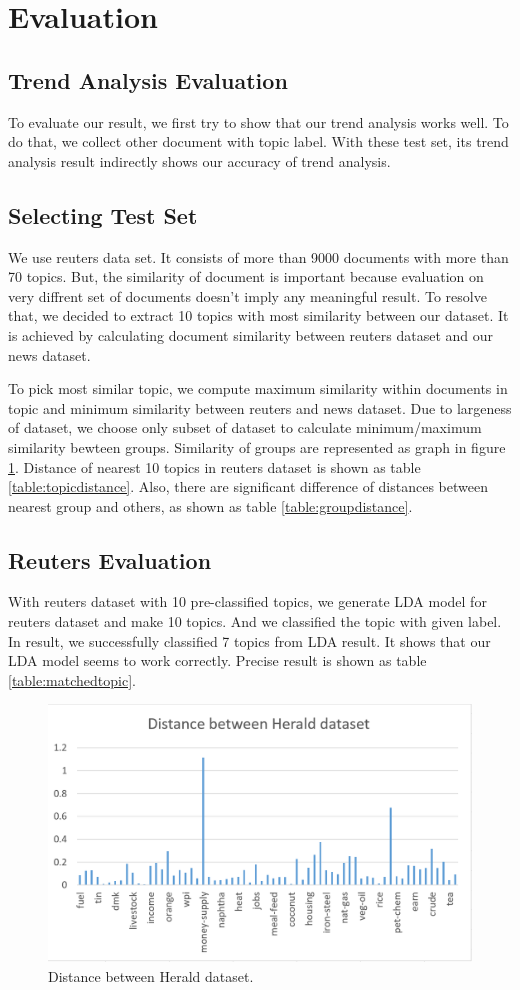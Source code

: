 \section{Evaluation}

\subsection{Trend Analysis Evaluation}
To evaluate our result, we first try to show that our trend analysis
works well. To do that, we collect other document with topic label.
With these test set, its trend analysis result indirectly shows our
accuracy of trend analysis.
\subsection{Selecting Test Set}
We use reuters data set. It consists of more than 9000 documents
with more than 70 topics. But, the similarity of document is important
because evaluation on very diffrent set of documents doesn't imply
any meaningful result. To resolve that, we decided to extract 10 topics
with most similarity between our dataset. It is achieved by calculating
document similarity between reuters dataset and our news dataset.

To pick most similar topic, we compute maximum similarity within documents
in topic and minimum similarity between reuters and news dataset. Due to
largeness of dataset, we choose only subset of dataset to calculate
minimum/maximum similarity bewteen groups. Similarity of groups are
represented as graph in figure \ref{fig:distance}. Distance of nearest
10 topics in reuters dataset is shown as table \ref{table:topicdistance}.
Also, there are significant difference of distances between nearest group and
others, as shown as table \ref{table:groupdistance}.

\subsection{Reuters Evaluation}
With reuters dataset with 10 pre-classified topics, we generate LDA
model for reuters dataset and make 10 topics. And we classified the topic
with given label. In result, we successfully classified 7 topics from
LDA result. It shows that our LDA model seems to work correctly. Precise
result is shown as table \ref{table:matchedtopic}.

\begin{figure}[!htbp]
  \centering
  \includegraphics[width=0.8\linewidth]{Distance1}
  \caption{Distance between Herald dataset.}
  \label{fig:distance}
\end{figure}

